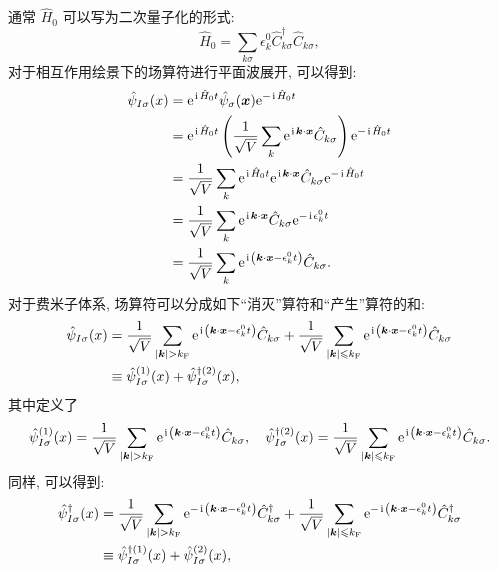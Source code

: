通常 $\hat{H}_{0}$ 可以写为二次量子化的形式: 
\begin{equation}\displaystyle\hat{H}_{0}=\sum_{k \sigma} \epsilon_{k}^{0} \hat{C}_{k \sigma}^{\dagger} \hat{C}^{}_{k \sigma},\end{equation}
对于相互作用绘景下的场算符进行平面波展开, 可以得到:
\begin{align}
\hat{\psi}_{I \sigma}(x) &=\mathrm{e}^{\hspace{0.1em}\mathrm{i}\hspace{0.1em} \hat{H}_{0} t} \hat{\psi}_{\sigma}(\boldsymbol{x}) \mathrm{e}^{-\hspace{0.1em}\mathrm{i}\hspace{0.1em} \hat{H}_{0} t} \nonumber\\
&=\mathrm{e}^{\hspace{0.1em}\mathrm{i}\hspace{0.1em} \hat{H}_{0} t}\left(\frac{1}{\sqrt{V}} \sum_{k} \mathrm{e}^{\hspace{0.1em}\mathrm{i}\hspace{0.1em} \boldsymbol{k} \cdot \boldsymbol{x}} \hat{C}_{k \sigma}\right) \mathrm{e}^{-\hspace{0.1em}\mathrm{i}\hspace{0.1em} \hat{H}_{0} t} \nonumber\\
&=\frac{1}{\sqrt{V}} \sum_{k} \mathrm{e}^{\hspace{0.1em}\mathrm{i}\hspace{0.1em} \hat{H}_{0} t} \mathrm{e}^{\hspace{0.1em}\mathrm{i}\hspace{0.1em} \boldsymbol{k} \cdot \boldsymbol{x}} \hat{C}_{k \sigma} \mathrm{e}^{-\hspace{0.1em}\mathrm{i}\hspace{0.1em} \hat{H}_{0} t} \nonumber\\
&=\frac{1}{\sqrt{V}} \sum_{k} \mathrm{e}^{\hspace{0.1em}\mathrm{i}\hspace{0.1em} \boldsymbol{k} \cdot \boldsymbol{x}} \hat{C}_{k \sigma} \mathrm{e}^{-\hspace{0.1em}\mathrm{i}\hspace{0.1em} \epsilon_{k}^{0} t} \nonumber\\
&=\frac{1}{\sqrt{V}} \sum_{k} \mathrm{e}^{\hspace{0.1em}\mathrm{i}\hspace{0.1em}\left(\boldsymbol{k} \cdot \boldsymbol{x}-\epsilon_{k}^{0} t\right)} \hat{C}_{k \sigma} .
\end{align}
对于费米子体系, 场算符可以分成如下“消灭”算符和“产生”算符的和:
\begin{align}
\hat{\psi}_{I \sigma}(x) &=\frac{1}{\sqrt{V}} \sum_{|\vct{k}|>k_{\fun F}} \e^{\ii\left(\vct{k} \cdot \vct{x}-\epsilon_{k}^{0} t\right)} \hat{C}_{k \sigma}+\frac{1}{\sqrt{V}} \sum_{|\vct{k}| \leqslant k_{\fun F}} \e^{\ii\left(\vct{k} \cdot \vct{x}-\epsilon_{k}^{0} t\right)} \hat{C}_{k \sigma} \nonumber\\
&\equiv\hat{\psi}_{I \sigma}^{(1)}(x)+\hat{\psi}_{I \sigma}^{\dagger(2)}(x) ,
\end{align}
其中定义了
\begin{equation}
\hat{\psi}_{I \sigma}^{(1)}(x)=\frac{1}{\sqrt{V}} \sum_{|\vct{k}|>k_{\fun F}} \e^{\ii\left(\vct{k} \cdot \vct{x}-\epsilon_{k}^{0} t\right)} \hat{C}_{k \sigma}, \quad \hat{\psi}_{I \sigma}^{\dagger(2)}(x)=\frac{1}{\sqrt{V}} \sum_{|\vct{k}| \leqslant k_{\fun F}} \e^{\ii\left(\vct{k} \cdot \vct{x}-\epsilon_{k}^{0} t\right)} \hat{C}_{k \sigma}.
\end{equation}
同样, 可以得到:
\begin{align}
\hat{\psi}^{\dagger}_{I \sigma}(x) &=\frac{1}{\sqrt{V}} \sum_{|\vct{k}|>k_{\fun F}} \e^{-\ii\left(\vct{k} \cdot \vct{x}-\epsilon_{k}^{0} t\right)} \hat{C}^{\dagger}_{k \sigma}+\frac{1}{\sqrt{V}} \sum_{|\vct{k}| \leqslant k_{\fun F}} \e^{-\ii\left(\vct{k} \cdot \vct{x}-\epsilon_{k}^{0} t\right)} \hat{C}^{\dagger}_{k \sigma}\nonumber \\
&\equiv\hat{\psi}_{I \sigma}^{\dagger(1)}(x)+\hat{\psi}_{I \sigma}^{(2)}(x) ,
\end{align}
